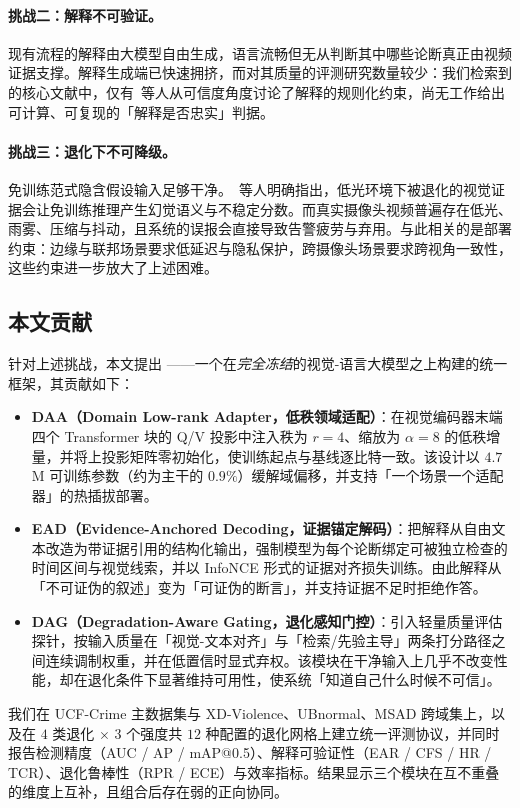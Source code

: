 \paragraph{挑战二：解释不可验证。} 现有流程的解释由大模型自由生成，语言流畅但无从判断其中哪些论断真正由视频证据支撑。解释生成端已快速拥挤，而对其质量的评测研究数量较少：我们检索到的核心文献中，仅有\citeauthor{khedher2025trustworthy}~等人从可信度角度讨论了解释的规则化约束\cite{khedher2025trustworthy}，尚无工作给出可计算、可复现的「解释是否忠实」判据。

\paragraph{挑战三：退化下不可降级。} 免训练范式隐含假设输入足够干净。\citeauthor{mo2026lowlight}~等人明确指出，低光环境下被退化的视觉证据会让免训练推理产生幻觉语义与不稳定分数\cite{mo2026lowlight}。而真实摄像头视频普遍存在低光、雨雾、压缩与抖动，且系统的误报会直接导致告警疲劳与弃用。与此相关的是部署约束：边缘与联邦场景要求低延迟与隐私保护\cite{yun2025edgegnn,li2026federated,wang2025holotrace}，跨摄像头场景要求跨视角一致性\cite{mishra2026dementia}，这些约束进一步放大了上述困难。

\subsection{本文贡献}

针对上述挑战，本文提出 \evivad{}——一个在\emph{完全冻结}的视觉-语言大模型之上构建的统一框架，其贡献如下：

\begin{itemize}
  \item \textbf{DAA（Domain Low-rank Adapter，低秩领域适配）}：在视觉编码器末端四个 Transformer 块的 Q/V 投影中注入秩为 $r{=}4$、缩放为 $\alpha{=}8$ 的低秩增量，并将上投影矩阵零初始化，使训练起点与基线逐比特一致。该设计以 $4.7$\,M 可训练参数（约为主干的 $0.9\%$）缓解域偏移，并支持「一个场景一个适配器」的热插拔部署。
  \item \textbf{EAD（Evidence-Anchored Decoding，证据锚定解码）}：把解释从自由文本改造为带证据引用的结构化输出，强制模型为每个论断绑定可被独立检查的时间区间与视觉线索，并以 InfoNCE 形式的证据对齐损失训练。由此解释从「不可证伪的叙述」变为「可证伪的断言」，并支持证据不足时拒绝作答。
  \item \textbf{DAG（Degradation-Aware Gating，退化感知门控）}：引入轻量质量评估探针，按输入质量在「视觉-文本对齐」与「检索/先验主导」两条打分路径之间连续调制权重，并在低置信时显式弃权。该模块在干净输入上几乎不改变性能，却在退化条件下显著维持可用性，使系统「知道自己什么时候不可信」。
\end{itemize}

我们在 UCF-Crime 主数据集与 XD-Violence、UBnormal、MSAD 跨域集上，以及在 $4$ 类退化 $\times$ $3$ 个强度共 $12$ 种配置的退化网格上建立统一评测协议，并同时报告检测精度（AUC / AP / mAP@0.5）、解释可验证性（EAR / CFS / HR / TCR）、退化鲁棒性（RPR / ECE）与效率指标。结果显示三个模块在互不重叠的维度上互补，且组合后存在弱的正向协同。
